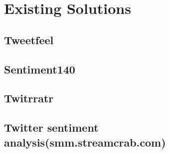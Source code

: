 \section{Existing Solutions}
	\subsection{Tweetfeel}
	
	\subsection{Sentiment140}
	\subsection{Twitrratr}
	\subsection{Twitter sentiment analysis(smm.streamcrab.com)}